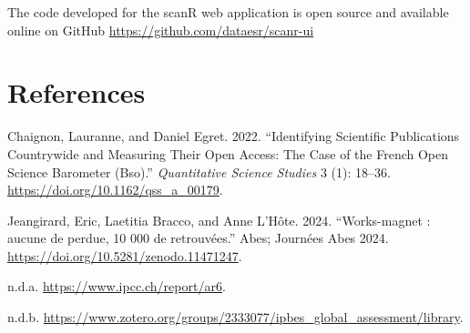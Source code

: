 \documentclass[
]{article}
\newlength{\cslhangindent}
\newenvironment{cslreferences}%
  {\setlength{\parindent}{0pt}%
  \everypar{\setlength{\hangindent}{\cslhangindent}}\ignorespaces}%
  {\par}
\begin{document}
The code developed for the scanR web application is open source and
available online on GitHub \url{https://github.com/dataesr/scanr-ui}

\hypertarget{references}{%
\section*{References}\label{references}}

\hypertarget{refs}{}
\begin{cslreferences}
\leavevmode\hypertarget{ref-10.1162ux2fqss_a_00179}{}%
Chaignon, Lauranne, and Daniel Egret. 2022. ``Identifying Scientific
Publications Countrywide and Measuring Their Open Access: The Case of
the French Open Science Barometer (Bso).'' \emph{Quantitative Science
Studies} 3 (1): 18--36. \url{https://doi.org/10.1162/qss_a_00179}.

\leavevmode\hypertarget{ref-jeangirard:hal-04598201}{}%
Jeangirard, Eric, Laetitia Bracco, and Anne L'Hôte. 2024. ``Works-magnet
: aucune de perdue, 10 000 de retrouvées.'' Abes; Journées Abes 2024.
\url{https://doi.org/10.5281/zenodo.11471247}.

\leavevmode\hypertarget{ref-ipccbibliography}{}%
n.d.a. \url{https://www.ipcc.ch/report/ar6}.

\leavevmode\hypertarget{ref-ipbesbibliography}{}%
n.d.b.
\url{https://www.zotero.org/groups/2333077/ipbes_global_assessment/library}.
\end{cslreferences}
\end{document}
